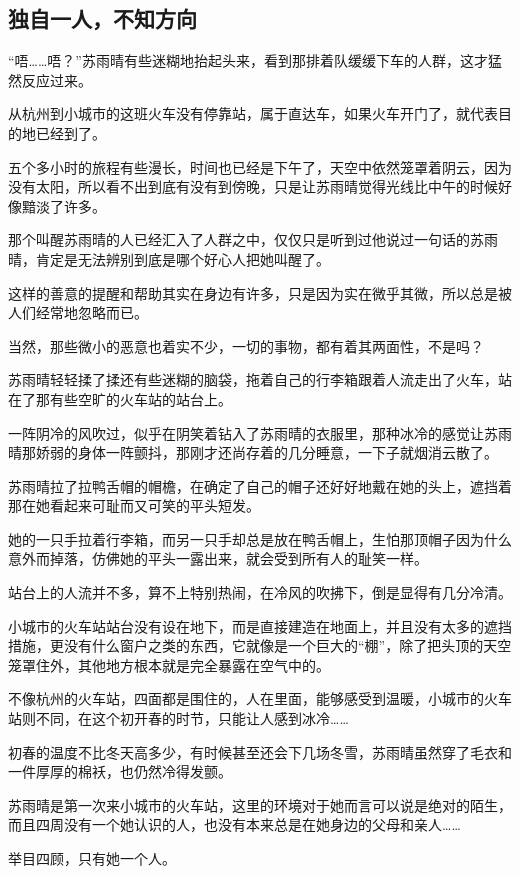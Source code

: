 \subsection{独自一人，不知方向}

“唔……唔？”苏雨晴有些迷糊地抬起头来，看到那排着队缓缓下车的人群，这才猛然反应过来。

从杭州到小城市的这班火车没有停靠站，属于直达车，如果火车开门了，就代表目的地已经到了。

五个多小时的旅程有些漫长，时间也已经是下午了，天空中依然笼罩着阴云，因为没有太阳，所以看不出到底有没有到傍晚，只是让苏雨晴觉得光线比中午的时候好像黯淡了许多。

那个叫醒苏雨晴的人已经汇入了人群之中，仅仅只是听到过他说过一句话的苏雨晴，肯定是无法辨别到底是哪个好心人把她叫醒了。

这样的善意的提醒和帮助其实在身边有许多，只是因为实在微乎其微，所以总是被人们经常地忽略而已。

当然，那些微小的恶意也着实不少，一切的事物，都有着其两面性，不是吗？

苏雨晴轻轻揉了揉还有些迷糊的脑袋，拖着自己的行李箱跟着人流走出了火车，站在了那有些空旷的火车站的站台上。

一阵阴冷的风吹过，似乎在阴笑着钻入了苏雨晴的衣服里，那种冰冷的感觉让苏雨晴那娇弱的身体一阵颤抖，那刚才还尚存着的几分睡意，一下子就烟消云散了。

苏雨晴拉了拉鸭舌帽的帽檐，在确定了自己的帽子还好好地戴在她的头上，遮挡着那在她看起来可耻而又可笑的平头短发。

她的一只手拉着行李箱，而另一只手却总是放在鸭舌帽上，生怕那顶帽子因为什么意外而掉落，仿佛她的平头一露出来，就会受到所有人的耻笑一样。

站台上的人流并不多，算不上特别热闹，在冷风的吹拂下，倒是显得有几分冷清。

小城市的火车站站台没有设在地下，而是直接建造在地面上，并且没有太多的遮挡措施，更没有什么窗户之类的东西，它就像是一个巨大的“棚”，除了把头顶的天空笼罩住外，其他地方根本就是完全暴露在空气中的。

不像杭州的火车站，四面都是围住的，人在里面，能够感受到温暖，小城市的火车站则不同，在这个初开春的时节，只能让人感到冰冷……

初春的温度不比冬天高多少，有时候甚至还会下几场冬雪，苏雨晴虽然穿了毛衣和一件厚厚的棉袄，也仍然冷得发颤。

苏雨晴是第一次来小城市的火车站，这里的环境对于她而言可以说是绝对的陌生，而且四周没有一个她认识的人，也没有本来总是在她身边的父母和亲人……

举目四顾，只有她一个人。

